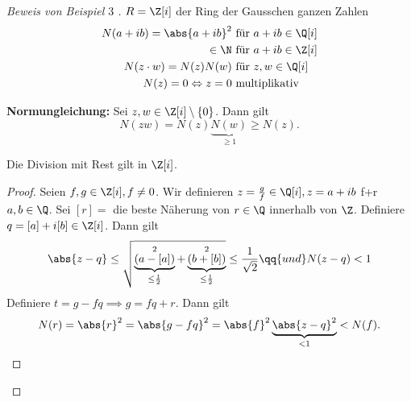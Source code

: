 \begin{proof}[Beweis von Beispiel $3$ ]
	$R = \Z[i]$ der Ring der Gausschen ganzen Zahlen
	\begin{align*}
		N(a+ib) = \abs{a+ib}^2 &\text{ für } a + ib \in \Q[i] \\
		\in \N &\text{ für } a+ib \in \Z[i]\\
		N(z\cdot w) = N(z) N(w) &\text{ für } z,w \in \Q[i]\\
		N(z) = 0  \Leftrightarrow z = 0 &\text{ multiplikativ} 
	\end{align*}

	\textbf{Normungleichung:} Sei $z,w \in \Z[i] \setminus \{0\}$. Dann gilt
	\[
		N(zw) = N(z) \underbrace{N(w)}_{\geq 1} \geq N(z)
	.\] 
	\begin{lemma}
		Die Division mit Rest gilt in $\Z[i]$.
	\end{lemma}
	\begin{proof}
		Seien $f,g \in \Z[i], f \neq 0$. Wir definieren $z = \frac{g}{f} \in \Q[i], z = a+ib$ f+r $a,b \in \Q$.
		Sei $[r] = $ die beste Näherung von $r \in \Q$ innerhalb von $\Z$.
		Definiere $q = [a] + i[b] \in \Z[i]$. Dann gilt 
		\begin{align*}
			\abs{z-q} \leq \sqrt{\underbrace{(a- [a])}_{\leq \frac{1}{2}}^2 + \underbrace{(b+[b])}_{\leq \frac{1}{2}}^2} \leq \frac{1}{\sqrt{2}} \qq{ und }
			N(z-q) < 1
		\end{align*}
		Definiere $t = g - f q \implies g = fq + r$. Dann gilt
		\begin{align*}
			N(r) = \abs{r}^2 = \abs{g-fq}^2 = \abs{f}^2 \underbrace{\abs{z-q}^2}_{< 1} < N(f)
		.\end{align*}
	\end{proof}
\end{proof}

